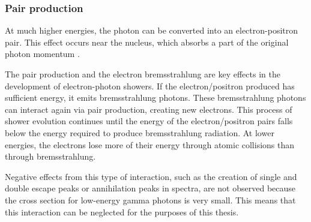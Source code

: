 \subsubsection{Pair production}
At much higher energies, the photon can be converted into an electron-positron pair. This effect occurs near the nucleus, which absorbs a part of the original photon momentum \cite{Leo1987-wy}.
\par
The pair production and the electron bremsstrahlung are key effects in the development of electron-photon showers. If the electron/positron produced has sufficient energy, it emits bremsstrahlung photons. These bremsstrahlung photons can interact again via pair production, creating new electrons. This process of shower evolution continues until the energy of the electron/positron pairs falls below the energy required to produce bremsstrahlung radiation. At lower energies, the electrons lose more of their energy through atomic collisions than through bremsstrahlung.
\par
Negative effects from this type of interaction, such as the creation of single and double escape peaks or annihilation peaks in spectra, are not observed because the cross section for low-energy gamma photons is very small. This means that this interaction can be neglected for the purposes of this thesis. 


